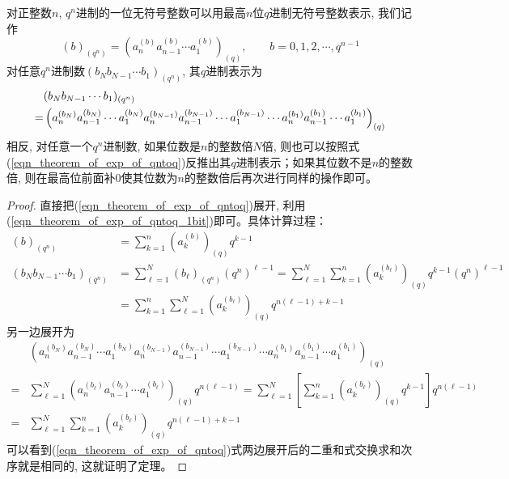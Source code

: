 \begin{theorem*}
    对正整数$n$, $q^n$进制的一位无符号整数可以用最高$n$位$q$进制无符号整数表示, 我们记作
    \begin{equation}
        (b)_{(q^n)}=\left(a^{(b)}_{n}a^{(b)}_{n-1}\cdots a^{(b)}_1\right)_{(q)},\qquad b=0,1,2,\cdots,q^{n-1}\label{eqn_theorem_of_exp_of_qntoq_1bit}
    \end{equation}
    对任意$q^n$进制数$(b_Nb_{N-1}\cdots b_1)_{(q^n)}$, 其$q$进制表示为
    \begin{align}
        &(b_Nb_{N-1}\cdots b_1)_{(q^n)}\notag\\=&\left(a^{(b_N)}_{n}a^{(b_N)}_{n-1}\cdots a^{(b_N)}_1a^{(b_{N-1})}_{n}a^{(b_{N-1})}_{n-1}\cdots a^{(b_{N-1})}_1\cdots a^{(b_1)}_{n}a^{(b_1)}_{n-1}\cdots a^{(b_1)}_1\right)_{(q)}\label{eqn_theorem_of_exp_of_qntoq}
    \end{align}
    相反, 对任意一个$q^n$进制数, 如果位数是$n$的整数倍$N$倍, 则也可以按照式(\ref{eqn_theorem_of_exp_of_qntoq})反推出其$q$进制表示；如果其位数不是$n$的整数倍, 则在最高位前面补0使其位数为$n$的整数倍后再次进行同样的操作即可。
\end{theorem*}
\begin{proof}
    直接把(\ref{eqn_theorem_of_exp_of_qntoq})展开, 利用(\ref{eqn_theorem_of_exp_of_qntoq_1bit})即可。具体计算过程：
    \[\begin{split}
        (b)_{(q^n)}&=\sum_{k=1}^n \left(a_k^{(b)}\right)_{(q)} q^{k-1}\\
        (b_Nb_{N-1}\cdots b_1)_{(q^n)}&=\sum_{\ell=1}^N(b_\ell)_{(q^n)}(q^n)^{\ell-1}=\sum_{\ell=1}^N\sum_{k=1}^n \left(a_k^{(b_\ell)}\right)_{(q)} q^{k-1}(q^n)^{\ell-1}\\
        &=\sum_{k=1}^n\sum_{\ell=1}^N \left(a_k^{(b_\ell)}\right)_{(q)} q^{n(\ell-1)+k-1}
    \end{split}\]
    另一边展开为
    \[\begin{split}
        &\left(a^{(b_N)}_{n}a^{(b_N)}_{n-1}\cdots a^{(b_N)}_1a^{(b_{N-1})}_{n}a^{(b_{N-1})}_{n-1}\cdots a^{(b_{N-1})}_1\cdots a^{(b_1)}_{n}a^{(b_1)}_{n-1}\cdots a^{(b_1)}_1\right)_{(q)}\\
        =&\sum_{\ell=1}^N\left(a^{(b_\ell)}_{n}a^{(b_\ell)}_{n-1}\cdots a^{(b_\ell)}_1\right)_{(q)} q^{n(\ell-1)}=\sum_{\ell=1}^N\left[\sum_{k=1}^n\left(a^{(b_\ell)}_{k}\right)_{(q)} q^{k-1}\right] q^{n(\ell-1)}\\
        =&\sum_{\ell=1}^N\sum_{k=1}^n \left(a_k^{(b_\ell)}\right)_{(q)} q^{n(\ell-1)+k-1}
    \end{split}\]
    可以看到(\ref{eqn_theorem_of_exp_of_qntoq})式两边展开后的二重和式交换求和次序就是相同的, 这就证明了定理。
\end{proof}
